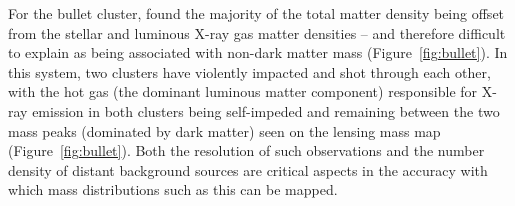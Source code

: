 \documentclass{pasa}%
\begin{document}



For the bullet cluster, \citet{Clowe+2006} found the majority of the total matter density being offset from the stellar and luminous X-ray gas matter densities -- and therefore difficult to explain as being associated with non-dark matter mass (Figure~\ref{fig:bullet}). In this system, two clusters have violently impacted and shot through each other, with the hot gas (the dominant luminous matter component) responsible for X-ray emission in both clusters being self-impeded and remaining between the two mass peaks (dominated by dark matter) seen on the lensing mass map (Figure~\ref{fig:bullet}). Both the resolution of such observations and the number density of distant background sources are critical aspects in the accuracy with which mass distributions such as this can be mapped.  
\end{document}

